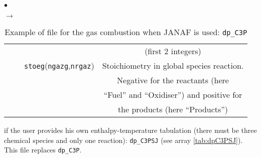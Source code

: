 {{{\begin{list}{$\bullet$}{}
\begin{list}{$\rightarrow$}{}
\begin{table}[htbp]
\begin{center}
{\begin{tabular}{|c|c|c|c|}
        &                   &                              & (first 2 integers)                               \\
        &                   &\texttt{stoeg\index{stoeg}}(\texttt{ngazg},\texttt{nrgaz})& Stoichiometry in global species reaction.       \\
        &                   &                               & Negative for the reactants (here                \\
        &                   &                               & ``Fuel'' and ``Oxidiser'') and positive for      \\
        &                   &                               & the products (here ``Products'')                \\ \hline
\end{tabular}
}
\caption{Example of file for the gas combustion when JANAF is used: \texttt{dp\_C3P}}\label{tab:dpC3P}
\end{center}
\end{table}

               \item if the user provides his own enthalpy-temperature tabulation
                     (there must be three chemical species and only
                     one reaction): \texttt{dp\_C3PSJ} (see
                     array \ref{tab:dpC3PSJ}). This file replaces \texttt{dp\_C3P}.


\end{list}
\end{list}}}}
